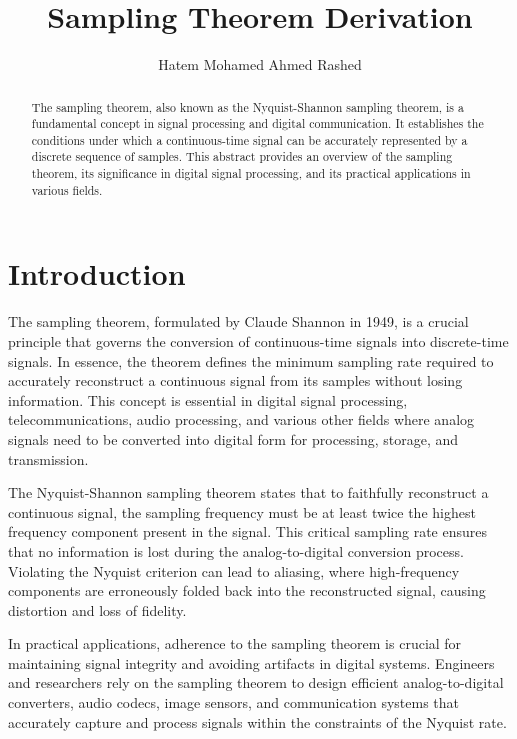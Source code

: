 \documentclass{IEEEtran}
\begin{document}
	\newcommand{\authorID}[2]{#1{\space #2}}
	
	\title{Sampling Theorem Derivation}
	
	\author{\authorID{Hatem Mohamed Ahmed Rashed}{20010447}}
	
	\maketitle
	
	\begin{abstract}
		
		The sampling theorem, also known as the Nyquist-Shannon sampling theorem, is a fundamental concept in signal processing and digital communication. It establishes the conditions under which a continuous-time signal can be accurately represented by a discrete sequence of samples. This abstract provides an overview of the sampling theorem, its significance in digital signal processing, and its practical applications in various fields.
	\end{abstract}
	
	\section{Introduction}
	
		The sampling theorem, formulated by Claude Shannon in 1949, is a crucial principle that governs the conversion of continuous-time signals into discrete-time signals. In essence, the theorem defines the minimum sampling rate required to accurately reconstruct a continuous signal from its samples without losing information. This concept is essential in digital signal processing, telecommunications, audio processing, and various other fields where analog signals need to be converted into digital form for processing, storage, and transmission.
		
		The Nyquist-Shannon sampling theorem states that to faithfully reconstruct a continuous signal, the sampling frequency must be at least twice the highest frequency component present in the signal. This critical sampling rate ensures that no information is lost during the analog-to-digital conversion process. Violating the Nyquist criterion can lead to aliasing, where high-frequency components are erroneously folded back into the reconstructed signal, causing distortion and loss of fidelity.
		
		In practical applications, adherence to the sampling theorem is crucial for maintaining signal integrity and avoiding artifacts in digital systems. Engineers and researchers rely on the sampling theorem to design efficient analog-to-digital converters, audio codecs, image sensors, and communication systems that accurately capture and process signals within the constraints of the Nyquist rate.
		
\end{document}
